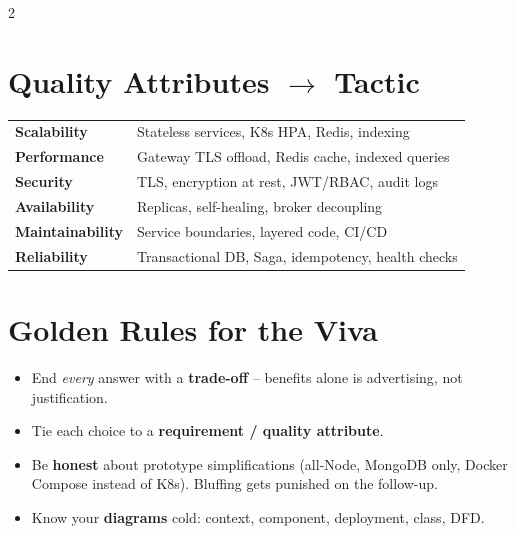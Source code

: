 \documentclass[10pt,a4paper]{article}
\begin{document}
\begin{multicols}{2}
\columnbreak

\section{Quality Attributes $\rightarrow$ Tactic}
{\footnotesize
\begin{tabular}{@{}>{\bfseries}p{2.2cm} p{6.0cm}@{}}
Scalability & Stateless services, K8s HPA, Redis, indexing\\
Performance & Gateway TLS offload, Redis cache, indexed queries\\
Security & TLS, encryption at rest, JWT/RBAC, audit logs\\
Availability & Replicas, self-healing, broker decoupling\\
Maintainability & Service boundaries, layered code, CI/CD\\
Reliability & Transactional DB, Saga, idempotency, health checks\\
\end{tabular}}

\section{Golden Rules for the Viva}
{\footnotesize
\begin{itemize}
  \item End \emph{every} answer with a \textbf{trade-off} -- benefits alone is advertising, not
        justification.
  \item Tie each choice to a \textbf{requirement / quality attribute}.
  \item Be \textbf{honest} about prototype simplifications (all-Node, MongoDB only, Docker
        Compose instead of K8s). Bluffing gets punished on the follow-up.
  \item Know your \textbf{diagrams} cold: context, component, deployment, class, DFD.
\end{itemize}}

\end{multicols}

\vspace{1pt}
\end{document}
